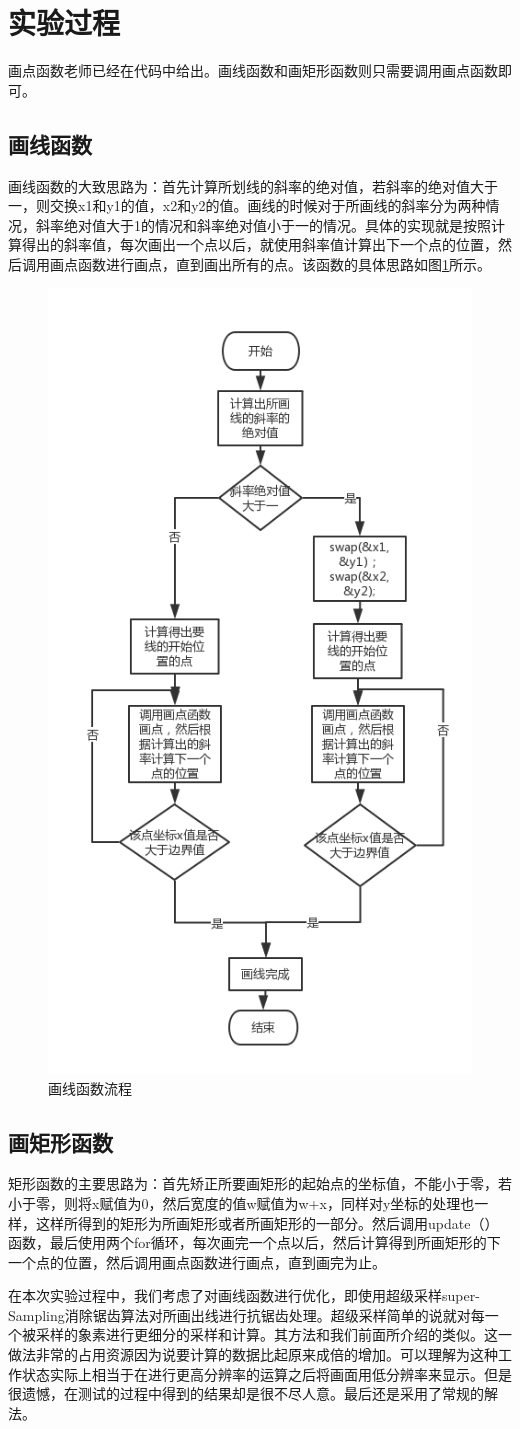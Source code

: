\documentclass{report}
\begin{document}
\section{实验过程}
画点函数老师已经在代码中给出。画线函数和画矩形函数则只需要调用画点函数即可。

\subsection{画线函数}
\par 画线函数的大致思路为：首先计算所划线的斜率的绝对值，若斜率的绝对值大于一，则交换x1和y1的值，x2和y2的值。画线的时候对于所画线的斜率分为两种情况，斜率绝对值大于1的情况和斜率绝对值小于一的情况。具体的实现就是按照计算得出的斜率值，每次画出一个点以后，就使用斜率值计算出下一个点的位置，然后调用画点函数进行画点，直到画出所有的点。该函数的具体思路如图\ref{fig:drawline}所示。
\begin{figure}[htpb]
    \centering
    \includegraphics[width=0.35\linewidth]{drawline.png}
    \caption{画线函数流程}
    \label{fig:drawline}
\end{figure}

\subsection{画矩形函数}
\par 矩形函数的主要思路为：首先矫正所要画矩形的起始点的坐标值，不能小于零，若小于零，则将x赋值为0，然后宽度的值w赋值为w+x，同样对y坐标的处理也一样，这样所得到的矩形为所画矩形或者所画矩形的一部分。然后调用update（）函数，最后使用两个for循环，每次画完一个点以后，然后计算得到所画矩形的下一个点的位置，然后调用画点函数进行画点，直到画完为止。

\par 在本次实验过程中，我们考虑了对画线函数进行优化，即使用超级采样super-Sampling消除锯齿算法对所画出线进行抗锯齿处理。超级采样简单的说就对每一个被采样的象素进行更细分的采样和计算。其方法和我们前面所介绍的类似。这一做法非常的占用资源因为说要计算的数据比起原来成倍的增加。可以理解为这种工作状态实际上相当于在进行更高分辨率的运算之后将画面用低分辨率来显示。但是很遗憾，在测试的过程中得到的结果却是很不尽人意。最后还是采用了常规的解法。
\end{document}
